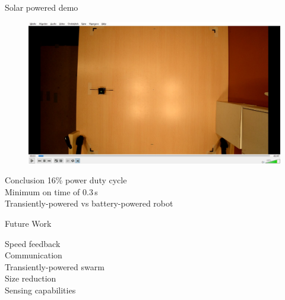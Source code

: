 \documentclass{beamer}
\begin{document}
\begin{frame}{Solar powered demo}
	\begin{figure}
		\centering
		\includegraphics[width=\textwidth]{pics/video.jpg}
	\end{figure}
\end{frame}

\begin{frame}{Conclusion}
	16\% power duty cycle \\
	\vspace{1em}
	Minimum on time of 0.3\,s \\
	\vspace{1em}
	Transiently-powered vs battery-powered robot \\
	\vspace{1em}
\end{frame}

\begin{frame}{Future Work}

	Speed feedback \\
	\vspace{1em}
	Communication \\
	\vspace{1em}
	Transiently-powered swarm \\
	\vspace{1em}
	Size reduction \\
	\vspace{1em}
	Sensing capabilities \\
	
\end{frame}
\end{document}
